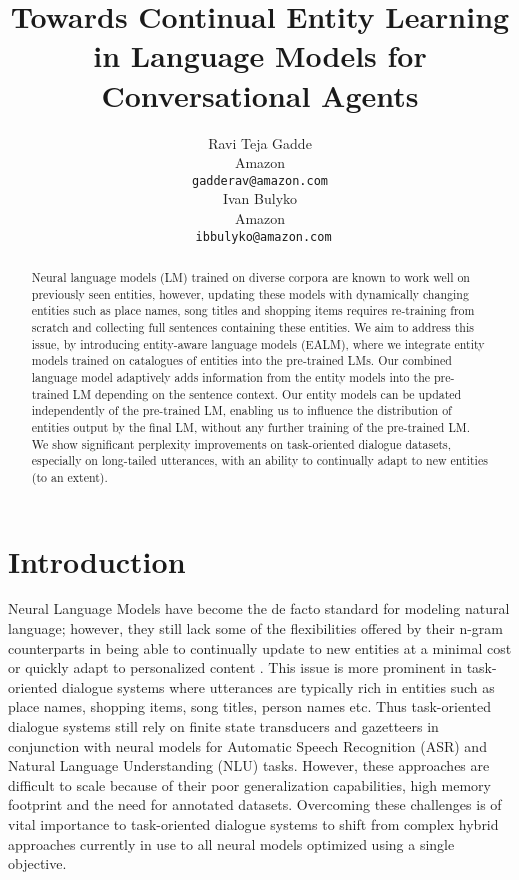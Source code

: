 \documentclass{article}
\title{Towards Continual Entity Learning in Language Models for Conversational Agents}
\author{%
  Ravi Teja Gadde \\
  Amazon\\
  \texttt{gadderav@amazon.com} \\
  \And
  Ivan Bulyko \\
  Amazon \\
 \texttt{ ibbulyko@amazon.com} \\
}
\begin{document}
\maketitle

\begin{abstract}
Neural language models (LM) trained on diverse corpora are known to work well on previously seen entities, however, updating these models with dynamically changing entities such as place names, song titles and shopping items requires re-training from scratch and collecting full sentences containing these entities. We aim to address this issue, by introducing entity-aware language models (EALM), where we integrate entity models trained on catalogues of entities into the pre-trained LMs. Our combined language model adaptively adds information from the entity models into the pre-trained LM depending on the sentence context. Our entity models can be updated independently of the pre-trained LM, enabling us to influence the distribution of entities output by the final LM, without any further training of the pre-trained LM. We show significant perplexity improvements on task-oriented dialogue datasets, especially on long-tailed utterances, with an ability to continually adapt to new entities (to an extent).
\end{abstract}


\section{Introduction}
\label{introduction}

Neural Language Models have become the de facto standard for modeling natural language; however, they still lack some of the flexibilities offered by their n-gram counterparts \citep{brown1992class} in being able to continually update to new entities at a minimal cost \citep{Pusateri2019} or quickly adapt to personalized content \citep{43819}. This issue is more prominent in task-oriented dialogue systems where utterances are typically rich in entities such as place names, shopping items, song titles, person names etc. Thus task-oriented dialogue systems still rely on finite state transducers \citep{mohri2002weighted} and gazetteers \citep{mikheev1999named} in conjunction with neural models for Automatic Speech Recognition (ASR) \citep{le2021contextualized, Zhao2019, 9413962} and Natural Language Understanding (NLU) \citep{kumar2017just, wu-etal-2018-evaluating} tasks. However, these approaches are difficult to scale because of their poor generalization capabilities, high memory footprint and the need for annotated datasets. Overcoming these challenges is of vital importance to task-oriented dialogue systems to shift from complex hybrid approaches currently in use to all neural models optimized using a single objective.
\end{document}
